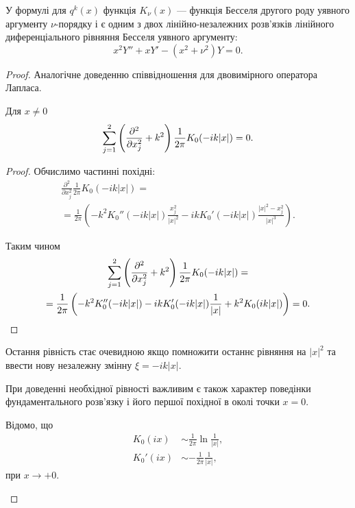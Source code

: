 \begin{remark}
	У формулі для $q^k(x)$ функція $K_\nu(x)$ --- функція Бесселя другого роду уявного аргументу $\nu$-порядку і є одним з двох лінійно-незалежних розв'язків лінійного диференціального рівняння Бесселя уявного аргументу:
	\begin{equation}
		x^2 Y'' + x Y' - (x^2 + \nu^2) Y = 0.
	\end{equation}
\end{remark}

\begin{proof}
	Аналогічне доведенню співвідношення для двовимірного оператора Лапласа.

	\begin{proposition} 
		Для $x \ne 0$
		\begin{equation}
			\displaystyle\sum\limits_{j = 1}^2 \left(\frac{\partial^2}{\partial x_j^2} + k^2\right) \frac{1}{2\pi} K_0(-ik|x|) = 0.
		\end{equation}
	\end{proposition}
 
 	\begin{proof}
		Обчислимо частинні похідні:
		\begin{multline}
			\frac{\partial^2}{\partial x_j^2}\frac{1}{2\pi}K_0(-ik|x|) = \\
			= \frac{1}{2\pi}\left(-k^2K_0''(-ik|x|)\frac{x_j^2}{|x|^2}-ikK_0'(-ik|x|)\frac{|x|^2-x_j^2}{|x|^3}\right).
		\end{multline}

		Таким чином
		\begin{multline}
			\displaystyle\sum\limits_{j=1}^2\left(\frac{\partial^2}{\partial x_j^2}+k^2\right)\frac{1}{2\pi}K_0(-ik|x|) = \\
			= \frac{1}{2\pi}\left(-k^2K_0''(-ik|x|)-ikK_0'(-ik|x|)\frac{1}{|x|}+k^2K_0(ik|x|)\right)=0.
		\end{multline}
	\end{proof}

	\begin{remark}
		Остання рівність стає очевидною якщо помножити останнє рівняння на $|x|^2$ та ввести нову незалежну змінну $\xi = - i k |x|$.
	\end{remark}

	\begin{remark}
		При доведенні необхідної рівності важливим є також характер поведінки фундаментального розв'язку і його першої похідної в околі точки $x = 0$. \medskip

		Відомо, що
		\begin{align}
			K_0(ix) &\sim \frac{1}{2\pi} \ln\frac{1}{|x|}, \\
			K_0'(ix) &\sim -\frac{1}{2\pi} \frac{1}{|x|},
		\end{align}
		при $x\to+0$.
	\end{remark}
\end{proof}

